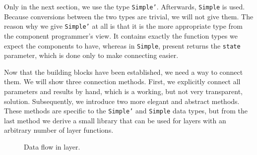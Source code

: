 \par Only in the next section, we use the type \texttt{Simple'}. Afterwards,
      \texttt{Simple} is used. Because conversions between the two types are trivial,
      we will not give them. The reason why we give \texttt{Simple'} at all is that
      it is the more appropriate type from the component programmer's view. It
      contains exactly the function types we expect the components to have, whereas
      in \texttt{Simple}, present returns the \texttt{state} parameter, which is done
      only to make connecting easier.
\par Now that the building blocks have been established, we need a way to
      connect them. We will show three connection methods. First, we explicitly
      connect all parameters and results by hand, which is a working, but not very
      transparent, solution. Subsequently, we introduce two more elegant and abstract
      methods. These methods are specific to the \texttt{Simple'} and \texttt{Simple}
      data types, but from the last method we derive a small library that can be used
      for layers with an arbitrary number of layer functions. 
\begin{figure}
\begin{small}
\begin{center}
\begin{center}
\begin{scriptsize}
\bigskip \noindent
{}
\end{scriptsize}
\end{center}\caption{Data flow in layer.}\label{wrapped} 
\end{center}
\end{small}
\end{figure}

